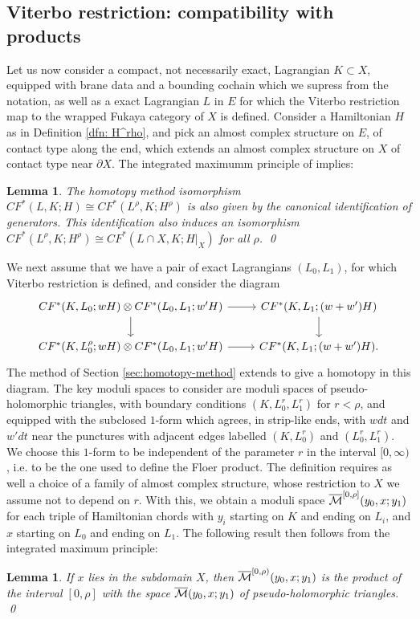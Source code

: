 \documentclass{article}
\theoremstyle{plain}%
\newtheorem{lem}[thm]{Lemma}
\theoremstyle{definition}
\numberwithin{equation}{section}
\numberwithin{figure}{section}
\def\cM{{\mathbin{\cal M}}}
\def\Mbar{\overline{\cM}}
\begin{document}
\subsection{Viterbo restriction: compatibility with products}
\label{sec:viterbo-restr-cohom}

Let us now consider a compact, not necessarily exact, Lagrangian $K \subset X$, equipped with brane data and a bounding cochain which we supress from the notation, as well as a exact Lagrangian $L$ in $E$ for which the Viterbo restriction map to the wrapped Fukaya category of $X$ is defined. Consider a Hamiltonian $H$ as in Definition \ref{dfn: H^rho}, and pick an almost complex structure on $E$, of contact type along the end, which extends an almost complex structure on $X$ of contact type near $\partial X$. The integrated maximumm principle of \cite{AS} implies:
\begin{lem} \label{lem:integrated_maximum_gives_identifications}
The homotopy method isomorphism $ CF^*(L,K; H)  \cong CF^*(L^{\rho},K; H^{\rho}) $ is also given by the canonical identification of generators. This identification also induces an isomorphism $CF^* (L^{\rho},K; H^{\rho}) \cong CF^*(L \cap X, K; H|_{X})$ for all $\rho$.  \qed
\end{lem}

We next assume that we have a pair of exact Lagrangians $(L_0, L_1)$, for which Viterbo restriction is defined, and consider the diagram
\begin{equation} \label{eq:restriction_preserves_product}
  \begin{tikzcd}
    CF^*(K, L_0; w H) \otimes  CF^*(L_0,L_1; w' H)  \ar[r] \ar[d] &  CF^*(K, L_1; (w+w') H)  \ar[d]  \\
    CF^*(K, L^{\rho}_0; w H) \otimes  CF^*(L_0,L_1; w' H)  \ar[r] &  CF^*(K, L_1; (w+w') H) .
  \end{tikzcd}
\end{equation}
The method of Section \ref{sec:homotopy-method} extends to give a homotopy in this diagram. The key moduli spaces to consider are moduli spaces of pseudo-holomorphic triangles, with boundary conditions $(K, L^{r}_0,  L^{r}_1)$ for $r < \rho$, and equipped with the subclosed $1$-form which agrees, in strip-like ends, with $w dt$ and $w' dt$ near the punctures with adjacent edges labelled $(K,L^{r}_0)$ and $(L^{r}_0, L^{r}_1)$. We choose this $1$-form to be independent of the parameter $r$ in the interval $[0,\infty)$, i.e. to be the one used to define the Floer product. The definition requires as well a choice of a family of almost complex structure, whose restriction to $X$ we assume not to depend on $r$. With this, we obtain a moduli space $\Mbar^{[0,\rho]}(y_0, x; y_1)$ for each triple of Hamiltonian chords with $y_i$ starting on $K$ and ending on $L_i$, and  $x$ starting on $L_0$ and ending on $L_1$. The following result then follows from the integrated maximum principle:
\begin{lem}
 If $x$ lies in the subdomain $X$, then  $\Mbar^{[0,\rho)}(y_0, x; y_1)$ is the product of the interval $[0,\rho]$ with the space $\Mbar(y_0, x; y_1)$ of pseudo-holomorphic triangles. \qed
\end{lem}
\end{document}
